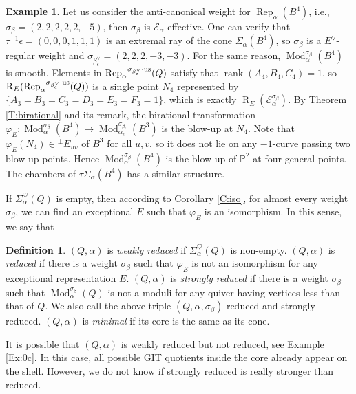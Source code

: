 \documentclass{amsart}
\theoremstyle{definition}
\newtheorem{definition}[theorem]{Definition}
\newtheorem{example}[theorem]{Example}
\theoremstyle{remark}
\numberwithin{equation}{section}
\begin{document}
\begin{example}
Let us consider the anti-canonical weight for ${\operatorname{Rep}}_\alpha(B^4)$, i.e., $\sigma_\beta=(2,2,2,2,2,-5)$, then $\sigma_\beta$ is ${\mathcal{{E}}}_\alpha$-effective. One can verify that $\tau^{-1}\epsilon=(0,0,0,1,1,1)$ is an extremal ray of the cone $\Sigma_\alpha(B^4)$, so $\sigma_\beta$ is a $E^\vee$-regular weight and $\sigma_{\beta_\epsilon^\vee}=(2,2,2,-3,-3)$. For the same reason, ${\operatorname{Mod}}_\alpha^{\sigma_\beta}(B^4)$ is smooth. Elements in ${\operatorname{Rep}}_\alpha{^{\sigma_{{\beta_\epsilon^\vee}}\cdot{\rm {us}}}}(Q)$ satisfy that ${\operatorname{rank}}(A_4,B_4,C_4)=1$, so ${\operatorname{R}}_E({\operatorname{Rep}}_\alpha{^{\sigma_{{\beta_\epsilon^\vee}}\cdot{\rm {us}}}}(Q))$ is a single point $N_4$ represented by $\{A_3=B_3=C_3=D_3=E_3=F_3=1\}$, which is exactly ${\operatorname{R}}_E({\mathcal{{E}}}_\alpha^{\sigma_\beta})$. By Theorem \ref{T:birational} and its remark, the birational transformation $\varphi_E: {\operatorname{Mod}}_\alpha^{\sigma_\beta}(B^4)\to {\operatorname{Mod}}_{\alpha_\epsilon}^{\sigma_{\beta_\epsilon}}(B^3)$ is the blow-up at $N_4$.  Note that $\varphi_E(N_4)\in {{^\perp}\!} E_{uv}$ of $B^3$ for all $u,v$, so it does not lie on any $-1$-curve passing two blow-up points. Hence ${\operatorname{Mod}}_\alpha^{\sigma_\beta}(B^4)$ is the blow-up of ${\mathbb{{P}}}^2$ at four general points. The chambers of $\tau\Sigma_\alpha(B^4)$ has a similar structure.

\end{example}

If $\Sigma_\alpha^\heartsuit(Q)$ is empty, then according to Corollary \ref{C:iso}, for almost every weight $\sigma_\beta$, we can find an exceptional $E$ such that $\varphi_E$ is an isomorphism. In this sense, we say that

\begin{definition} $(Q,\alpha)$ is {\em weakly reduced} if $\Sigma_\alpha^\heartsuit(Q)$ is non-empty. $(Q,\alpha)$ is {\em reduced} if there is a weight $\sigma_\beta$ such that $\varphi_E$ is not an isomorphism for any exceptional representation $E$. $(Q,\alpha)$ is {\em strongly reduced} if there is a weight $\sigma_\beta$ such that ${\operatorname{Mod}}_\alpha^{\sigma_\beta}(Q)$ is not a moduli for any quiver having vertices less than that of $Q$. We also call the above triple $(Q,\alpha,\sigma_\beta)$ reduced and strongly reduced. $(Q,\alpha)$ is {\em minimal} if its core is the same as its cone.
\end{definition}

It is possible that $(Q,\alpha)$ is weakly reduced but not reduced, see Example \ref{Ex:0c}. In this case, all possible GIT quotients inside the core already appear on the shell.
However, we do not know if strongly reduced is really stronger than reduced.
\end{document}
